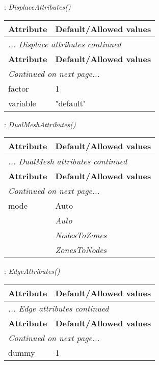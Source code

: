 \documentclass[10pt,a4paper]{report}
\begin{document}
\newpage

{}
: {\it DisplaceAttributes() }\\[-3mm]

\begin{longtable}{ll}
{\bf Attribute} & {\bf Default/Allowed values} \\
\hline \hline
\endfirsthead
\multicolumn{2}{l}{{\it ... Displace attributes continued}} \\
{\bf Attribute} & {\bf Default/Allowed values} \\
\hline \hline
\endhead
\hline
\multicolumn{2}{l}{{\it Continued on next page...}} \\
\endfoot
\hline
\endlastfoot

factor  &  1 \\
variable  &  "default" \\
\end{longtable}

\newpage

{}
: {\it DualMeshAttributes() }\\[-3mm]

\begin{longtable}{ll}
{\bf Attribute} & {\bf Default/Allowed values} \\
\hline \hline
\endfirsthead
\multicolumn{2}{l}{{\it ... DualMesh attributes continued}} \\
{\bf Attribute} & {\bf Default/Allowed values} \\
\hline \hline
\endhead
\hline
\multicolumn{2}{l}{{\it Continued on next page...}} \\
\endfoot
\hline
\endlastfoot

mode  &  Auto   \\
 & {\it  Auto} \\
 & {\it  NodesToZones} \\
 & {\it  ZonesToNodes} \\
\end{longtable}

\newpage

{}
: {\it EdgeAttributes() }\\[-3mm]

\begin{longtable}{ll}
{\bf Attribute} & {\bf Default/Allowed values} \\
\hline \hline
\endfirsthead
\multicolumn{2}{l}{{\it ... Edge attributes continued}} \\
{\bf Attribute} & {\bf Default/Allowed values} \\
\hline \hline
\endhead
\hline
\multicolumn{2}{l}{{\it Continued on next page...}} \\
\endfoot
\hline
\endlastfoot

dummy  &  1 \\
\end{longtable}
\end{document}
